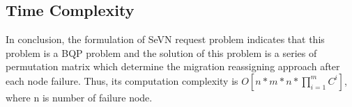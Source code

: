 
\subsection{Time Complexity}
In conclusion, the formulation of SeVN request problem indicates that this problem is a BQP problem and the solution of this problem is a series of permutation matrix  which determine the migration reassigning approach after each node failure. Thus, its computation complexity is $O[n*m*n*\prod_{i=1}^{m}C^i]$, where n is number of failure node.
